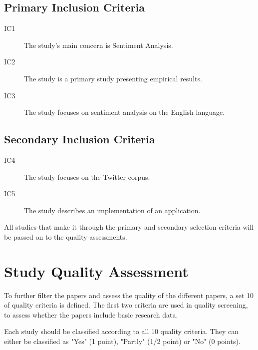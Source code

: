 \subsection{Primary Inclusion Criteria}

\begin{description}

\item[IC1] The study's main concern is Sentiment Analysis.
\item[IC2] The study is a primary study presenting empirical results.
\item[IC3] The study focuses on sentiment analysis on the English language.

\end{description}

\subsection{Secondary Inclusion Criteria}

\begin{description}


\item[IC4] The study focuses on the Twitter corpus.
\item[IC5] The study describes an implementation of an application.

\end{description}

All studies that make it through the primary and secondary selection criteria will be passed on to the quality assessments. 

\section{Study Quality Assessment}

To further filter the papers and assess the quality of the different papers, a set 10 of quality criteria is defined. The first two criteria are used in quality screening, to assess whether the papers include basic research data.

Each study should be classified according to all 10 quality criteria. They can either be classified as "Yes" (1 point), "Partly" (1/2 point) or "No" (0 points).

